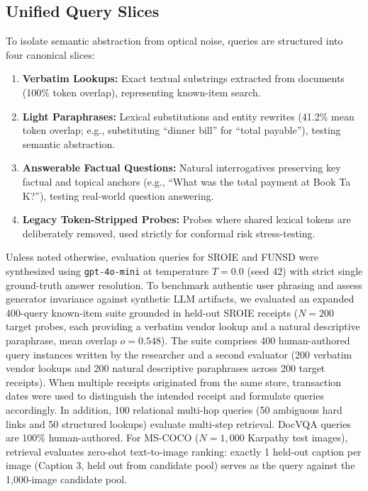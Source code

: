 \subsection{Unified Query Slices}
To isolate semantic abstraction from optical noise, queries are structured into four canonical slices:
\begin{enumerate}
    \setlength{\itemsep}{0pt}
    \setlength{\parskip}{0pt}
    \setlength{\parsep}{0pt}
    \setlength{\topsep}{1pt}
    \item \textbf{Verbatim Lookups:} Exact textual substrings extracted from documents (100\% token overlap), representing known-item search.
    \item \textbf{Light Paraphrases:} Lexical substitutions and entity rewrites (41.2\% mean token overlap; e.g., substituting ``dinner bill'' for ``total payable''), testing semantic abstraction.
    \item \textbf{Answerable Factual Questions:} Natural interrogatives preserving key factual and topical anchors (e.g., ``What was the total payment at Book Ta K?''), testing real-world question answering.
    \item \textbf{Legacy Token-Stripped Probes:} Probes where shared lexical tokens are deliberately removed, used strictly for conformal risk stress-testing.
\end{enumerate}
Unless noted otherwise, evaluation queries for SROIE and FUNSD were synthesized using \texttt{gpt-4o-mini} \cite{openai2024gpt4o} at temperature $T=0.0$ (seed 42) with strict single ground-truth answer resolution. To benchmark authentic user phrasing and assess generator invariance against synthetic LLM artifacts, we evaluated an expanded 400-query known-item suite grounded in held-out SROIE receipts ($N=200$ target probes, each providing a verbatim vendor lookup and a natural descriptive paraphrase, mean overlap $o=0.548$). The suite comprises 400 human-authored query instances written by the researcher and a second evaluator (200 verbatim vendor lookups and 200 natural descriptive paraphrases across 200 target receipts). When multiple receipts originated from the same store, transaction dates were used to distinguish the intended receipt and formulate queries accordingly. In addition, 100 relational multi-hop queries (50 ambiguous hard links and 50 structured lookups) evaluate multi-step retrieval. DocVQA queries are 100\% human-authored. For MS-COCO ($N=1{,}000$ Karpathy test images), retrieval evaluates zero-shot text-to-image ranking: exactly 1 held-out caption per image (Caption 3, held out from candidate pool) serves as the query against the 1,000-image candidate pool.

